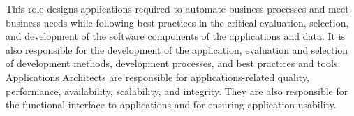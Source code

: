 \documentclass[10pt,a4paper,ragged2e,withhyper]{altacv}
\begin{document}
\begin{paracol}{2}















This role designs applications required to automate business processes and meet business needs while following best practices in the critical evaluation,  selection, and development of the software components of the applications and data. It is also responsible for the development of the application, evaluation and selection of development methods, development processes, and best practices and tools. Applications Architects are responsible for applications-related quality, performance, availability, scalability, and integrity. They are also responsible for the functional interface to applications and for ensuring application usability.


\end{paracol}
\end{document}
